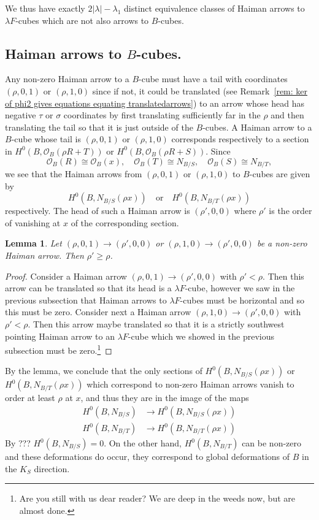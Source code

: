 \documentclass{amsart}
\newtheorem{lemma}[theorem]{Lemma}
\theoremstyle{definition}
\renewcommand{\O}{\mathcal{O}}
\begin{document}
We thus have exactly $2|\lambda |-\lambda_{1}$ distinct equivalence
classes of Haiman arrows to $\lambda F$-cubes which are not also
arrows to $B$-cubes.

\subsection{Haiman arrows to $B$-cubes.}  Any non-zero Haiman arrow to
a $B$-cube must have a tail with coordinates $(\rho ,0,1)$ or $(\rho
,1,0)$ since if not, it could be translated (see Remark~\ref{rem: ker
of phi2 gives equations equating translatedarrows}) to an arrow whose
head has negative $\tau$ or $\sigma$ coordinates by first translating
sufficiently far in the $\rho$ and then translating the tail so that
it is just outside of the $B$-cubes. A Haiman arrow to a $B$-cube
whose tail is $(\rho ,0,1)$ or $(\rho ,1,0)$ corresponds respectively
to a section in $H^{0}(B,\O_{B}(\rho R+T))$ or  $H^{0}(B,\O_{B}(\rho
R+S))$. Since
\[
\O_B (R)\cong \O_{B}(x),\quad \O_{B}(T)\cong N_{B/S},\quad \O_{B}(S)\cong N_{B/T},
\]
we see that the Haiman arrows from $(\rho ,0,1)$ or $(\rho ,1,0)$ to
$B$-cubes are given by 
\[
H^{0}(B,N_{B/S}(\rho x)) \quad \text{or}\quad
H^{0}(B,N_{B/T}(\rho x))
\]
respectively. The head of such a Haiman
arrow is $(\rho ',0,0)$ where $\rho '$ is the order of vanishing at
$x$ of the corresponding section.

\begin{lemma}\label{lem: Haiman arrows to B-cubes must vanish to the
order of the generator} Let $(\rho ,0,1)\to (\rho ',0,0)$ or $(\rho
,1,0)\to (\rho ',0,0)$ be a non-zero Haiman arrow. Then $\rho '\geq
\rho$.
\end{lemma}
\begin{proof}
Consider a Haiman arrow $(\rho ,0,1)\to (\rho ',0,0)$ with $\rho
'<\rho$. Then this arrow can be translated so that its head is a
$\lambda F$-cube, however we saw in the previous subsection that
Haiman arrows to $\lambda F$-cubes must be horizontal and so this must
be zero. Consider next a Haiman arrow $(\rho ,1,0)\to (\rho ',0,0)$
with $\rho '<\rho$. Then this arrow maybe translated so that it is a
strictly southwest pointing Haiman arrow to an $\lambda F$-cube which
we showed in the previous subsection must be zero.\footnote{Are you
still with us dear reader? We are deep in the weeds now, but are
almost done.}
\end{proof}

By the lemma, we conclude that the only sections of
$H^{0}(B,N_{B/S}(\rho x))$ or $H^{0}(B,N_{B/T}(\rho x))$ which
correspond to non-zero Haiman arrows vanish to order at least $\rho$
at $x$, and thus they are in the image of the maps
\begin{align*}
H^{0}(B,N_{B/S})&\to H^{0}(B,N_{B/S}(\rho x))\\
H^{0}(B,N_{B/T})&\to H^{0}(B,N_{B/T}(\rho x))
\end{align*}
By ??? $H^{0}(B,N_{B/S})=0$. On the other hand, $H^{0}(B,N_{B/T})$ can
be non-zero and these deformations do occur, they correspond to global
deformations of $B$ in the $K_{S}$ direction.
\end{document}
